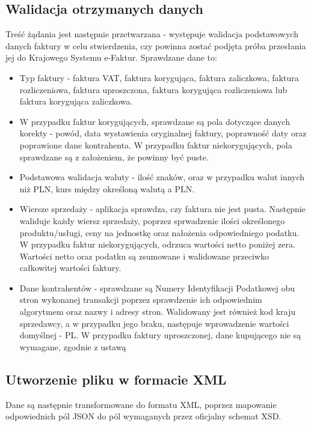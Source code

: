 \subsection{Walidacja otrzymanych danych}
Treść żądania jest następnie przetwarzana - występuje walidacja podstawowych danych faktury w celu stwierdzenia, czy powinna zostać podjęta próba przesłania jej do Krajowego Systemu e-Faktur. Sprawdzane dane to:
\begin{itemize}
    \item Typ faktury - faktura VAT, faktura korygująca, faktura zaliczkowa, faktura rozliczeniowa, faktura uproszczona, faktura korygująca rozliczeniowa lub faktura korygująca zaliczkowa.
    \item W przypadku faktur korygujących, sprawdzane są pola dotyczące danych korekty - powód, data wystawienia oryginalnej faktury, poprawność daty oraz poprawione dane kontrahenta. W przypadku faktur niekorygujących, pola sprawdzane są z założeniem, że powinny być puste.
    \item Podstawowa walidacja waluty - ilość znaków, oraz w przypadku walut innych niż PLN, kurs między określoną walutą a PLN. 
    \item Wiersze sprzedaży - aplikacja sprawdza, czy faktura nie jest pusta. Następnie waliduje każdy wiersz sprzedaży, poprzez sprwadzenie ilości określonego produktu/usługi, ceny na jednostkę oraz nałożenia odpowiedniego podatku. W przypadku faktur niekorygujących, odrzuca wartości netto poniżej zera. Wartości netto oraz podatku są zsumowane i walidowane przeciwko całkowitej wartości faktury.
    \item Dane kontrahentów - sprawdzane są Numery Identyfikacji Podatkowej obu stron wykonanej transakcji poprzez sprawdzenie ich odpowiednim algorytmem %
        oraz nazwy i adresy stron. Walidowany jest również kod kraju sprzedawcy, a w przypadku jego braku, następuje wprowadzenie wartości domyślnej - PL. W przypadku faktury uproszczonej, dane kupującego nie są wymagane, zgodnie z ustawą %
\end{itemize}

\subsection{Utworzenie pliku w formacie XML}
Dane są następnie transformowane do formatu XML, poprzez mapowanie odpowiednich pól JSON do pól wymaganych przez oficjalny schemat XSD. 

